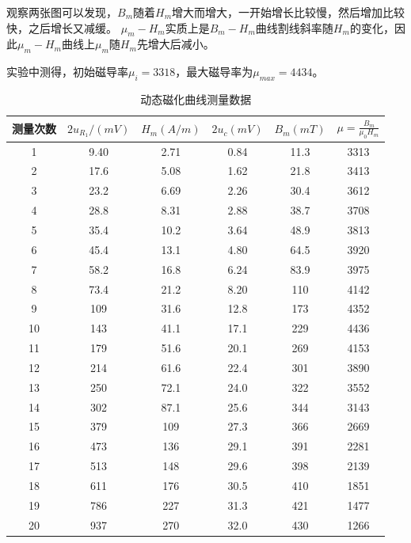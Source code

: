 \documentclass{article}
\begin{document}
    观察两张图可以发现，$B_m$随着$H_m$增大而增大，一开始增长比较慢，然后增加比较快，之后增长又减缓。
    $\mu_m-H_m$实质上是$B_m-H_m$曲线割线斜率随$H_m$的变化，因此$\mu_m-H_m$曲线上$\mu_m$随$H_m$先增大后减小。
    
    实验中测得，初始磁导率$\mu_i=3318$，最大磁导率为$\mu_{max}=4434$。

    \begin{table}[htb]
        \centering
        \caption{动态磁化曲线测量数据}
        \vspace{1ex}
        \begin{tabular}{cccccc}
            \toprule
            测量次数  & $2u_{R_1}/(mV)$ & $H_m(A/m)$ & $2u_c(mV)$ & $B_m(mT)$ & $\mu=\frac{B_m}{\mu_0H_m}$ \\
            \midrule
            1     & 9.40  & 2.71  & 0.84  & 11.3  & 3313  \\
            2     & 17.6  & 5.08  & 1.62  & 21.8  & 3413  \\
            3     & 23.2  & 6.69  & 2.26  & 30.4  & 3612  \\
            4     & 28.8  & 8.31  & 2.88  & 38.7  & 3708  \\
            5     & 35.4  & 10.2  & 3.64  & 48.9  & 3813  \\
            6     & 45.4  & 13.1  & 4.80  & 64.5  & 3920  \\
            7     & 58.2  & 16.8  & 6.24  & 83.9  & 3975  \\
            8     & 73.4  & 21.2  & 8.20  & 110   & 4142  \\
            9     & 109   & 31.6  & 12.8  & 173   & 4352  \\
            10    & 143   & 41.1  & 17.1  & 229   & 4436  \\
            11    & 179   & 51.6  & 20.1  & 269   & 4153  \\
            12    & 214   & 61.6  & 22.4  & 301   & 3890  \\
            13    & 250   & 72.1  & 24.0  & 322   & 3552  \\
            14    & 302   & 87.1  & 25.6  & 344   & 3143  \\
            15    & 379   & 109   & 27.3  & 366   & 2669  \\
            16    & 473   & 136   & 29.1  & 391   & 2281  \\
            17    & 513   & 148   & 29.6  & 398   & 2139  \\
            18    & 611   & 176   & 30.5  & 410   & 1851  \\
            19    & 786   & 227   & 31.3  & 421   & 1477  \\
            20    & 937   & 270   & 32.0  & 430   & 1266  \\
            \bottomrule
        \end{tabular}%
    \end{table}
    
\end{document}
